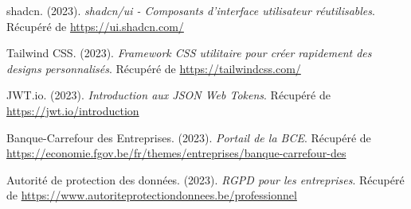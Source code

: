 \begin{thebibliography}{99}
shadcn. (2023).
\textit{shadcn/ui - Composants d'interface utilisateur réutilisables}.
Récupéré de \url{https://ui.shadcn.com/}

Tailwind CSS. (2023).
\textit{Framework CSS utilitaire pour créer rapidement des designs personnalisés}.
Récupéré de \url{https://tailwindcss.com/}

JWT.io. (2023).
\textit{Introduction aux JSON Web Tokens}.
Récupéré de \url{https://jwt.io/introduction}

Banque-Carrefour des Entreprises. (2023).
\textit{Portail de la BCE}.
Récupéré de \url{https://economie.fgov.be/fr/themes/entreprises/banque-carrefour-des}

Autorité de protection des données. (2023).
\textit{RGPD pour les entreprises}.
Récupéré de \url{https://www.autoriteprotectiondonnees.be/professionnel}

\end{thebibliography}
